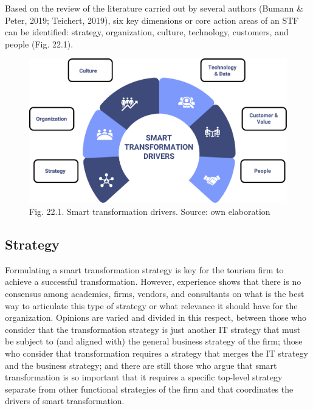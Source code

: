 \documentclass[
  letterpaper,
  DIV=11,
  numbers=noendperiod]{scrreprt}
\begin{document}
Based on the review of the literature carried out by several authors
(Bumann \& Peter, 2019; Teichert, 2019), six key dimensions or core
action areas of an STF can be identified: strategy, organization,
culture, technology, customers, and people (Fig. 22.1).

\begin{figure}

{\centering \includegraphics[width=6.25in,height=\textheight]{img/fig35.png}

}

\caption{Fig. 22.1. Smart transformation drivers. Source: own
elaboration}

\end{figure}

\hypertarget{strategy}{%
\subsection{Strategy}\label{strategy}}

Formulating a smart transformation strategy is key for the tourism firm
to achieve a successful transformation. However, experience shows that
there is no consensus among academics, firms, vendors, and consultants
on what is the best way to articulate this type of strategy or what
relevance it should have for the organization. Opinions are varied and
divided in this respect, between those who consider that the
transformation strategy is just another IT strategy that must be subject
to (and aligned with) the general business strategy of the firm; those
who consider that transformation requires a strategy that merges the IT
strategy and the business strategy; and there are still those who argue
that smart transformation is so important that it requires a specific
top-level strategy separate from other functional strategies of the firm
and that coordinates the drivers of smart transformation.
\end{document}
